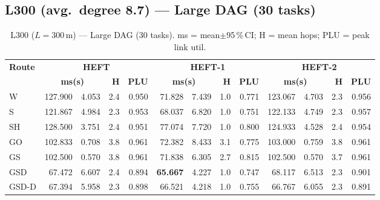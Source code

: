 \documentclass[11pt]{article}
\newcommand{\win}[1]{\textcolor{green!50!black}{\textbf{#1}}}
\newcommand{\bad}[1]{\textcolor{red!70!black}{#1}}
\begin{document}
\subsection{L300 (avg.\ degree 8.7) --- Large DAG (30 tasks)}
\begin{table}[H]\centering\small
\begin{tabular}{l r@{$\pm$}l r r r@{$\pm$}l r r r@{$\pm$}l r r}
\toprule
\textbf{Route} & \multicolumn{4}{c}{\textbf{HEFT}} & \multicolumn{4}{c}{\textbf{HEFT-1}} & \multicolumn{4}{c}{\textbf{HEFT-2}} \\
\cmidrule(lr){2-5}\cmidrule(lr){6-9}\cmidrule(lr){10-13}
& \multicolumn{2}{c}{\textbf{ms(s)}} & \textbf{H} & \textbf{PLU}& \multicolumn{2}{c}{\textbf{ms(s)}} & \textbf{H} & \textbf{PLU}& \multicolumn{2}{c}{\textbf{ms(s)}} & \textbf{H} & \textbf{PLU} \\
\midrule
  W & 127.900 & 4.053 & 2.4 & 0.950 & 71.828 & 7.439 & 1.0 & 0.771 & 123.067 & 4.703 & 2.3 & 0.956 \\
  S & 121.867 & 4.984 & 2.3 & 0.953 & 68.037 & 6.820 & 1.0 & 0.751 & 122.133 & 4.749 & 2.3 & 0.957 \\
  SH & \bad{128.500} & 3.751 & 2.4 & 0.951 & \bad{77.074} & 7.720 & 1.0 & 0.800 & \bad{124.933} & 4.528 & 2.4 & 0.954 \\
  GO & 102.833 & 0.708 & 3.8 & 0.961 & 72.382 & 8.433 & 3.1 & 0.775 & 103.000 & 0.759 & 3.8 & 0.961 \\
  GS & 102.500 & 0.570 & 3.8 & 0.961 & 71.838 & 6.305 & 2.7 & 0.815 & 102.500 & 0.570 & 3.7 & 0.961 \\
  GSD & 67.472 & 6.607 & 2.4 & 0.894 & \win{65.667} & 4.227 & 1.0 & 0.747 & 68.117 & 6.513 & 2.3 & 0.901 \\
  GSD-D & 67.394 & 5.958 & 2.3 & 0.898 & 66.521 & 4.218 & 1.0 & 0.755 & 66.767 & 6.055 & 2.3 & 0.891 \\
\bottomrule\end{tabular}
\caption{L300 ($L=300$\,m) --- Large DAG (30 tasks). ms = mean$\pm$95\,\%\,CI; H = mean hops; PLU = peak link util.}
\end{table}
\end{document}
